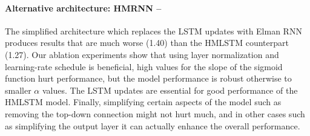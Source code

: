 \paragraph{Alternative architecture: HMRNN --} The simplified 
architecture which replaces the LSTM updates with Elman 
RNN produces results that are much worse (1.40) than 
the HMLSTM counterpart (1.27). Our ablation experiments show that using layer normalization and learning-rate schedule is beneficial, high values for the slope of the sigmoid function hurt performance, but the model performance is robust otherwise to smaller $\alpha$ values. The LSTM updates are essential for good performance of the HMLSTM model. Finally, simplifying certain aspects of the model such as removing the top-down connection might not hurt much, and in other cases such as simplifying the output layer it can actually enhance the overall performance. 



